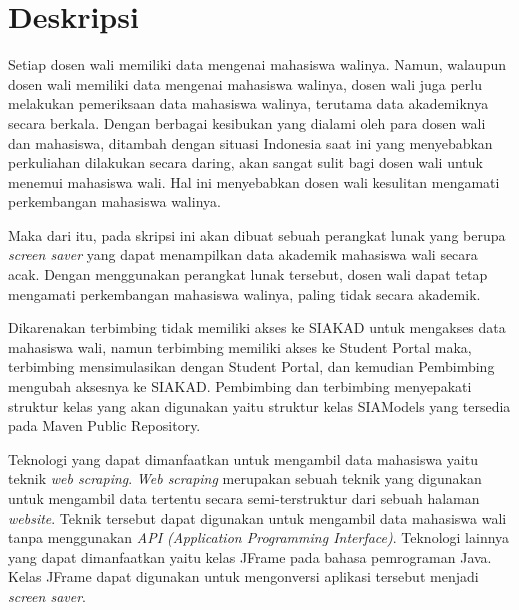 \documentclass[a4paper,twoside]{article}
\begin{document}
\title{\@judultopik}
\author{\nama \textendash \@npm} 

\newcommand{\nama}{Harry Senjaya Darmawan}
\newcommand{\@npm}{2017730067}
\newcommand{\@judultopik}{Mahasiswa Wali Screen Saver} %
\newcommand{\jumpemb}{1} %
\newcommand{\tanggal}{08/10/2020}


\maketitle


\section{Deskripsi}
Setiap dosen wali memiliki data mengenai mahasiswa walinya. Namun, walaupun dosen wali memiliki data mengenai mahasiswa walinya, dosen wali juga perlu melakukan pemeriksaan data mahasiswa walinya, terutama data akademiknya secara berkala. Dengan berbagai kesibukan yang dialami oleh para dosen wali dan mahasiswa, ditambah dengan situasi Indonesia saat ini yang menyebabkan perkuliahan dilakukan secara daring, akan sangat sulit bagi dosen wali untuk menemui mahasiswa wali. Hal ini menyebabkan dosen wali kesulitan mengamati perkembangan mahasiswa walinya. 

Maka dari itu, pada skripsi ini akan dibuat sebuah perangkat lunak yang berupa \textit{screen saver} yang dapat menampilkan data akademik mahasiswa wali secara acak. Dengan menggunakan perangkat lunak tersebut, dosen wali dapat tetap mengamati perkembangan mahasiswa walinya, paling tidak secara akademik.

Dikarenakan terbimbing tidak memiliki akses ke SIAKAD untuk mengakses data mahasiswa wali, namun terbimbing memiliki akses ke Student Portal maka, terbimbing mensimulasikan dengan Student Portal, dan kemudian Pembimbing mengubah aksesnya ke SIAKAD. Pembimbing dan terbimbing menyepakati struktur kelas yang akan digunakan yaitu struktur kelas SIAModels yang tersedia pada Maven Public Repository.

Teknologi yang dapat dimanfaatkan untuk mengambil data mahasiswa yaitu teknik \textit{web scraping}. \textit{Web scraping} merupakan sebuah teknik yang digunakan untuk mengambil data tertentu secara semi-terstruktur dari sebuah halaman \textit{website}. Teknik tersebut dapat digunakan untuk mengambil data mahasiswa wali tanpa menggunakan \textit{API (Application Programming Interface)}. Teknologi lainnya yang dapat dimanfaatkan yaitu kelas JFrame pada bahasa pemrograman Java. Kelas JFrame dapat digunakan untuk mengonversi aplikasi tersebut menjadi \textit{screen saver}.
\end{document}
